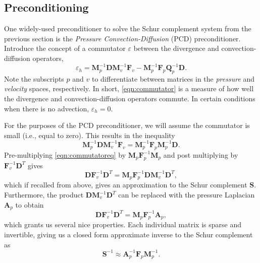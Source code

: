 \documentclass{article}
\newcommand{\mat}[1]{\bm{{#1}}}
\begin{document}
\subsection{Preconditioning}
One widely-used preconditioner to solve the Schur complement system from the previous section is the \textit{Pressure Convection-Diffusion} (PCD) preconditioner. Introduce the concept of a commutator $\varepsilon$ between the divergence and convection-diffusion operators,
\begin{equation}
  \varepsilon_h = \mat{M}_p^{-1}\mat{D}\mat{M}_v^{-1}\mat{F}_v - \mat{M}^{-1}_p\mat{F}_p\mat{Q}^{-1}_p\mat{D}. \label{eqn:commutator}
\end{equation}
Note the subscripts $p$ and $v$ to differentiate between matrices in the \textit{pressure} and \textit{velocity} spaces, respectively.
In short, \eqref{eqn:commutator} is a measure of how well the divergence and convection-diffusion operators commute.  In certain conditions when there is no advection, $\varepsilon_h=0$.

For the purposes of the PCD preconditioner, we will assume the commutator is small (i.e., equal to zero).  This results in the inequality
\begin{equation}
  \mat{M}_p^{-1}\mat{D}\mat{M}_v^{-1}\mat{F}_v = \mat{M}^{-1}_p\mat{F}_p\mat{M}^{-1}_p\mat{D}. \label{eqn:commutatoreq}
\end{equation}
Pre-multiplying \eqref{eqn:commutatoreq} by $\mat{M}_p\mat{F}^{-1}_p\mat{M}_p$ and post multiplying by $\mat{F}^{-1}_v\mat{D}^T$ gives
\begin{equation}
  \mat{D}\mat{F}_v^{-1}\mat{D}^T = \mat{M}_p\mat{F}_p^{-1}\mat{D}\mat{M}^{-1}_v\mat{D}^T, \label{eqn:commutatorschur}
\end{equation}
which if recalled from above, gives an approximation to the Schur complement $\mat{S}$.  Furthermore, the product $\mat{DM}_v^{-1}\mat{D}^T$ can be replaced with the pressure Laplacian $\mat{A}_p$ to obtain
\begin{equation}
  \mat{D}\mat{F}_v^{-1}\mat{D}^T = \mat{M}_p\mat{F}_p^{-1}\mat{A}_p, \label{eqn:schurlaplacian}
\end{equation}
which grants us several nice properties.  Each individual matrix is sparse and invertible, giving us a closed form approximate inverse to the Schur complement as
\begin{equation}
  \mat{S}^{-1} \approx \mat{A}_p^{-1} \mat{F}_p \mat{M}_p^{-1}. \label{eqn:schurclosed}
\end{equation}
\end{document}

